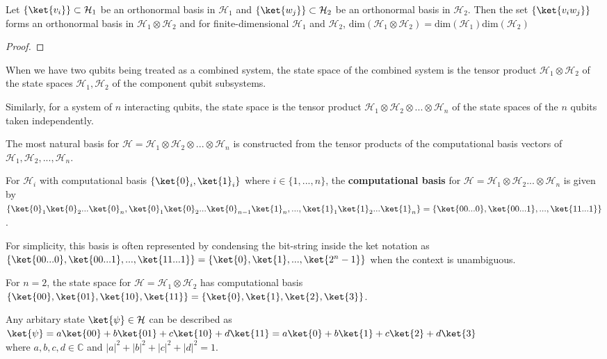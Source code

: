 \begin{prop}
    Let $\{ \ket{v_i} \} \subset \mathcal{H}_1$ be an orthonormal basis in $\mathcal{H}_1$ and $\{ \ket{w_j} \} \subset \mathcal{H}_2$ be an orthonormal basis in $\mathcal{H}_2$. Then the set $\{ \ket{v_i w_j} \}$ forms an orthonormal basis in $\mathcal{H}_1 \otimes \mathcal{H}_2$ and for finite-dimensional $\mathcal{H}_1$ and $\mathcal{H}_2$, $\text{dim}(\mathcal{H}_1 \otimes \mathcal{H}_2) = \text{dim}(\mathcal{H}_1) \text{dim}(\mathcal{H}_2)$
\end{prop}
\begin{proof}
\end{proof}

\begin{samepage}
\begin{lemma}
When we have two qubits being treated as a combined system, the state space of the combined system is the tensor product $\mathcal{H}_1 \otimes \mathcal{H}_2$ of the state spaces $\mathcal{H}_1, \mathcal{H}_2$ of the component qubit subsystems. 

    Similarly, for a system of $n$ interacting qubits, the state space is the tensor product $\mathcal{H}_1 \otimes \mathcal{H}_2 \otimes ... \otimes \mathcal{H}_n$ of the state spaces of the $n$ qubits taken independently.
\end{lemma}
\end{samepage}

The most natural basis for $\mathcal{H} = \mathcal{H}_1 \otimes \mathcal{H}_2 \otimes ... \otimes \mathcal{H}_n$ is constructed from the tensor products of the computational basis vectors of $\mathcal{H}_1, \mathcal{H}_2, ..., \mathcal{H}_n$. 
\begin{defn}
    For $\mathcal{H}_i$ with computational basis $\{ \ket{0}_i, \ket{1}_i \}$ where $i \in \{1, ..., n\}$, the \textbf{computational basis} for $\mathcal{H} = \mathcal{H}_1 \otimes \mathcal{H}_2 ... \otimes \mathcal{H}_n$ is given by $\{ \ket{0}_1\ket{0}_2...\ket{0}_n, \ket{0}_1\ket{0}_2...\ket{0}_{n-1}\ket{1}_n, ..., \ket{1}_1\ket{1}_2...\ket{1}_n\} = \{ \ket{00...0}, \ket{00...1}, ... , \ket{11...1} \}$.

    For simplicity, this basis is often represented by condensing the bit-string inside the ket notation as $ \{ \ket{00...0}, \ket{00...1}, ... , \ket{11...1} \} = \{ \ket{0}, \ket{1},..., \ket{2^n - 1} \}$ when the context is unambiguous.
\end{defn}

\begin{eg}
For $n=2$, the state space for $\mathcal{H} = \mathcal{H}_1 \otimes \mathcal{H}_2$ has computational basis $\{ \ket{00}, \ket{01}, \ket{10}, \ket{11} \} = \{ \ket{0}, \ket{1}, \ket{2}, \ket{3} \}$.

    Any arbitary state $\ket{\psi} \in \mathcal{H}$ can be described as $\ket{\psi} = a \ket{00} + b \ket{01} + c \ket{10} + d \ket{11} = a \ket{0} + b \ket{1} + c \ket{2} + d \ket{3}$ \\ where $a, b, c, d \in \mathbb{C}$ and $|a|^2 + |b|^2 + |c|^2 + |d|^2 = 1$.
\end{eg}



